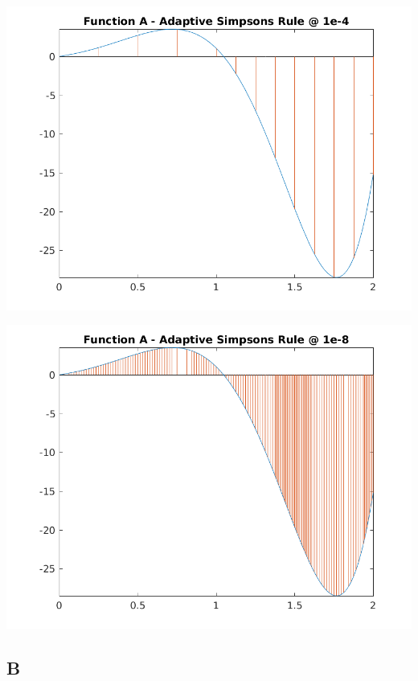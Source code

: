 \documentclass[a4paper]{article}
\begin{document}
\begin{center}
	\includegraphics[width=1\textwidth]{../output/a_adaptive_simpsons_4.png}
	\label{fig:a_adap4}
\end{center}

\begin{center}
	\includegraphics[width=1\textwidth]{../output/a_adaptive_simpsons_8.png}
	\label{fig:a_adap8}
\end{center}



\subsection{B}\label{results:b}
\end{document}
